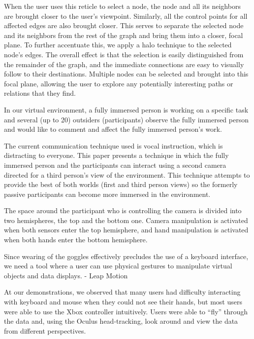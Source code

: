 When the user uses this reticle to select a node, the node and all its neighbors are brought closer to the user’s viewpoint. Similarly, all the control points for all affected edges are also brought closer. This serves to separate the selected node and its neighbors from the rest of the graph and bring them into a closer, focal plane. To further accentuate this, we apply a halo technique to the selected node’s edges. The overall effect is that the selection is easily distinguished from the remainder of the graph, and the immediate connections are easy to visually follow to their destinations. Multiple nodes can be selected and brought into this focal plane, allowing the user to explore any potentially interesting paths or relations that they find. \cite{Kwon2015}



In our virtual environment, a fully immersed person is working on a specific task and several (up to 20) outsiders (participants) observe the fully immersed person and would like to comment and affect the fully immersed person’s work. \cite{Deligiannidis2003}

The current communication technique used is vocal instruction, which is distracting to everyone. This paper presents a technique in which the fully immersed person and the participants can interact using a second camera directed for a third person’s view of the environment. This technique attempts to provide the best of both worlds (first and third person views) so the formerly passive participants can become more immersed in the environment. \cite{Deligiannidis2003}

The space around the participant who is controlling the camera is divided into two hemispheres, the top and the bottom one. Camera manipulation is activated when both sensors enter the top hemisphere, and hand manipulation is activated when both hands enter the bottom hemisphere. \cite{Deligiannidis2003}


Since wearing of the goggles effectively precludes the use of a keyboard interface, we need a tool where a user can use physical gestures to manipulate virtual objects and data displays. \cite{Donalek2014} - Leap Motion


At our demonstrations, we observed that many users had difficulty interacting with keyboard and mouse when they could not see their hands, but most users were able to use the Xbox controller intuitively. Users were able to “fly” through the data and, using the Oculus head-tracking, look around and view the data from different perspectives. \cite{Drouhard2015}

